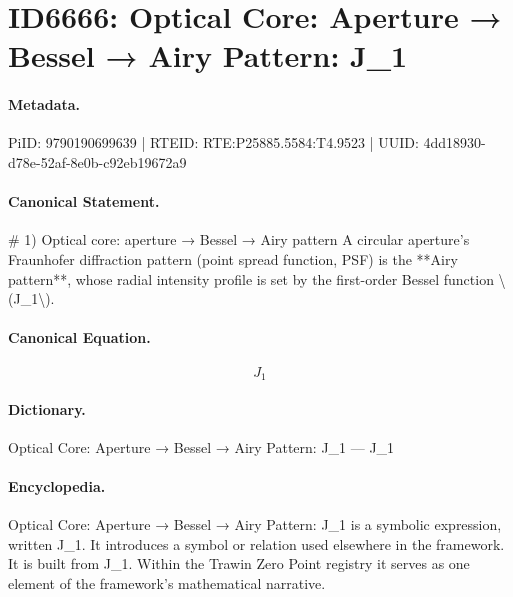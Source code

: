 \section*{ID6666: Optical Core: Aperture → Bessel → Airy Pattern: J\_1}
\paragraph{Metadata.}
PiID: 9790190699639 | RTEID: RTE:P25885.5584:T4.9523 | UUID: 4dd18930-d78e-52af-8e0b-c92eb19672a9

\paragraph{Canonical Statement.}
\# 1) Optical core: aperture → Bessel → Airy pattern A circular aperture’s Fraunhofer diffraction pattern (point spread function, PSF) is the **Airy pattern**, whose radial intensity profile is set by the first-order Bessel function \textbackslash{}(J\_1\textbackslash{}).

\paragraph{Canonical Equation.}
\[
J_1
\]

\paragraph{Dictionary.}
Optical Core: Aperture → Bessel → Airy Pattern: J\_1 — J\_1

\paragraph{Encyclopedia.}
Optical Core: Aperture → Bessel → Airy Pattern: J\_1 is a symbolic expression, written J\_1. It introduces a symbol or relation used elsewhere in the framework. It is built from J\_1. Within the Trawin Zero Point registry it serves as one element of the framework's mathematical narrative.

